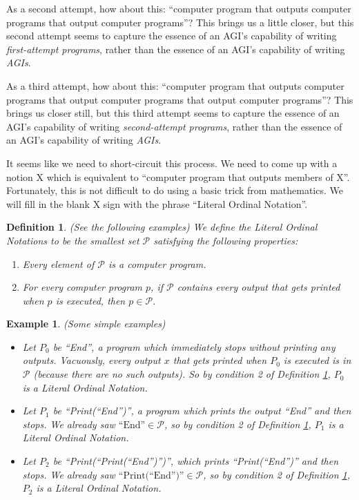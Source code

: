 \documentclass[runningheads]{llncs}
\newtheorem{myexample}[mytheorem]{Example}
\newtheorem{mydefinition}[mytheorem]{Definition}
\begin{document}
As a second attempt, how
about this: ``computer program that outputs computer programs that output
computer programs''? This brings us a little closer, but this second attempt
seems to capture the essence of an AGI's capability of writing \emph{first-attempt programs},
rather than the essence of an AGI's capability of writing \emph{AGIs}.

As a third attempt, how about this:
``computer program that outputs computer programs that output computer programs
that output computer programs''? This brings us closer still, but this third
attempt seems to capture the essence of an AGI's capability of writing
\emph{second-attempt programs}, rather than the essence of an AGI's capability of
writing \emph{AGIs}.

It seems like we need to short-circuit this process. We need to come up with a notion
X which is equivalent to ``computer program that outputs members of X''.
Fortunately, this is not difficult to do using a basic trick from mathematics.
We will fill in the blank X sign with the phrase ``Literal Ordinal Notation''.

\begin{mydefinition}
\label{literalnotationdef}
    (See the following examples)
    We define the Literal Ordinal Notations to be the smallest set $\mathcal P$
    satisfying the following properties:
    \begin{enumerate}
        \item
            Every element of $\mathcal P$ is a computer program.
        \item
            For every computer program $p$,
            if $\mathcal P$ contains every output that gets printed when $p$ is executed,
            then $p\in\mathcal P$.
    \end{enumerate}
\end{mydefinition}

\begin{myexample}
\label{simpleexamples}
(Some simple examples)
    \begin{itemize}
    \item
    Let $P_0$ be ``End'', a program which immediately stops without printing any outputs.
    Vacuously, every output $x$ that gets printed when $P_0$ is executed is in $\mathcal P$
    (because there are no such outputs). So by condition 2 of
    Definition \ref{literalnotationdef}, $P_0$ is a Literal Ordinal Notation.
    \item
    Let $P_1$ be ``Print(``End'')'', a program which prints the output ``End'' and then
    stops. We already saw $\mbox{``End''}\in\mathcal P$, so by condition 2 of
    Definition \ref{literalnotationdef}, $P_1$ is a Literal Ordinal Notation.
    \item
    Let $P_2$ be ``Print(``Print(``End'')'')'', which prints ``Print(``End'')'' and then
    stops. We already saw $\mbox{``Print(``End'')''}\in\mathcal P$, so by condition 2
    of Definition \ref{literalnotationdef}, $P_2$ is a Literal Ordinal Notation.
    \end{itemize}
\end{myexample}
\end{document}

